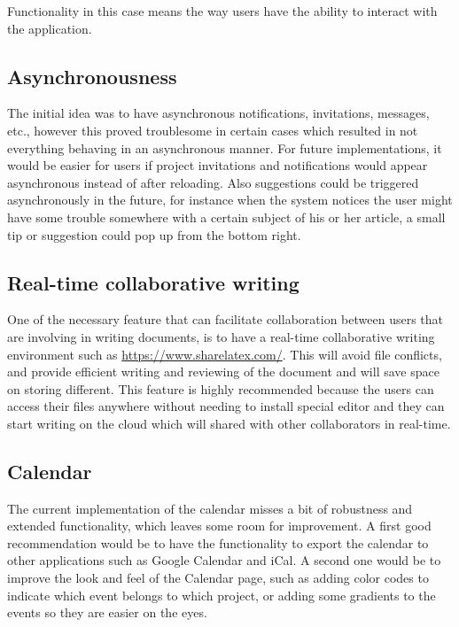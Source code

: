 Functionality in this case means the way users have the ability to interact with the application.

\subsection{Asynchronousness}

The initial idea was to have asynchronous notifications, invitations, messages, etc., however this proved troublesome in certain
cases which resulted in not everything behaving in an asynchronous manner. For future implementations, it would be easier for users
if project invitations and notifications would appear asynchronous instead of after reloading. Also suggestions could be
triggered asynchronously in the future, for instance when the system notices the user might have some trouble somewhere with
a certain subject of his or her article, a small tip or suggestion could pop up from the bottom right.

\subsection{Real-time collaborative writing } %
One of the necessary feature that can facilitate collaboration between users that are involving in writing documents, is to have a real-time collaborative writing environment such as \url{https://www.sharelatex.com/}. This will avoid file conflicts, and provide efficient writing and reviewing of the document and will save space on storing different. This feature is highly recommended because the users can access their files anywhere without needing to install special editor and they can start writing on the cloud which will shared with other collaborators in real-time. 


\subsection{Calendar}

The current implementation of the calendar misses a bit of robustness and extended functionality, which leaves some room for
improvement. A first good recommendation would be to have the functionality to export the calendar to other applications such as
Google Calendar and iCal. A second one would be to improve the look and feel of the Calendar page, such as adding color codes to
indicate which event belongs to which project, or adding some gradients to the events so they are easier on the eyes.

